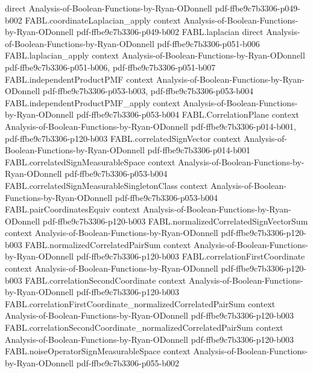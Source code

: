 \begin{theorem}
  {direct}
  {Analysis-of-Boolean-Functions-by-Ryan-ODonnell}
  {pdf-ffbe9c7b3306-p049-b002}
\proofstep
  {FABL.coordinateLaplacian_apply}
  {context}
  {Analysis-of-Boolean-Functions-by-Ryan-ODonnell}
  {pdf-ffbe9c7b3306-p049-b002}
\proofstep
  {FABL.laplacian}
  {direct}
  {Analysis-of-Boolean-Functions-by-Ryan-ODonnell}
  {pdf-ffbe9c7b3306-p051-b006}
\proofstep
  {FABL.laplacian_apply}
  {context}
  {Analysis-of-Boolean-Functions-by-Ryan-ODonnell}
  {pdf-ffbe9c7b3306-p051-b006,
    pdf-ffbe9c7b3306-p051-b007}
\proofstep
  {FABL.independentProductPMF}
  {context}
  {Analysis-of-Boolean-Functions-by-Ryan-ODonnell}
  {pdf-ffbe9c7b3306-p053-b003,
    pdf-ffbe9c7b3306-p053-b004}
\proofstep
  {FABL.independentProductPMF_apply}
  {context}
  {Analysis-of-Boolean-Functions-by-Ryan-ODonnell}
  {pdf-ffbe9c7b3306-p053-b004}
\proofstep
  {FABL.CorrelationPlane}
  {context}
  {Analysis-of-Boolean-Functions-by-Ryan-ODonnell}
  {pdf-ffbe9c7b3306-p014-b001,
    pdf-ffbe9c7b3306-p120-b003}
\proofstep
  {FABL.correlatedSignVector}
  {context}
  {Analysis-of-Boolean-Functions-by-Ryan-ODonnell}
  {pdf-ffbe9c7b3306-p014-b001}
\proofstep
  {FABL.correlatedSignMeasurableSpace}
  {context}
  {Analysis-of-Boolean-Functions-by-Ryan-ODonnell}
  {pdf-ffbe9c7b3306-p053-b004}
\proofstep
  {FABL.correlatedSignMeasurableSingletonClass}
  {context}
  {Analysis-of-Boolean-Functions-by-Ryan-ODonnell}
  {pdf-ffbe9c7b3306-p053-b004}
\proofstep
  {FABL.pairCoordinatesEquiv}
  {context}
  {Analysis-of-Boolean-Functions-by-Ryan-ODonnell}
  {pdf-ffbe9c7b3306-p120-b003}
\proofstep
  {FABL.normalizedCorrelatedSignVectorSum}
  {context}
  {Analysis-of-Boolean-Functions-by-Ryan-ODonnell}
  {pdf-ffbe9c7b3306-p120-b003}
\proofstep
  {FABL.normalizedCorrelatedPairSum}
  {context}
  {Analysis-of-Boolean-Functions-by-Ryan-ODonnell}
  {pdf-ffbe9c7b3306-p120-b003}
\proofstep
  {FABL.correlationFirstCoordinate}
  {context}
  {Analysis-of-Boolean-Functions-by-Ryan-ODonnell}
  {pdf-ffbe9c7b3306-p120-b003}
\proofstep
  {FABL.correlationSecondCoordinate}
  {context}
  {Analysis-of-Boolean-Functions-by-Ryan-ODonnell}
  {pdf-ffbe9c7b3306-p120-b003}
\proofstep
  {FABL.correlationFirstCoordinate_normalizedCorrelatedPairSum}
  {context}
  {Analysis-of-Boolean-Functions-by-Ryan-ODonnell}
  {pdf-ffbe9c7b3306-p120-b003}
\proofstep
  {FABL.correlationSecondCoordinate_normalizedCorrelatedPairSum}
  {context}
  {Analysis-of-Boolean-Functions-by-Ryan-ODonnell}
  {pdf-ffbe9c7b3306-p120-b003}
\proofstep
  {FABL.noiseOperatorSignMeasurableSpace}
  {context}
  {Analysis-of-Boolean-Functions-by-Ryan-ODonnell}
  {pdf-ffbe9c7b3306-p055-b002}

\end{theorem}
